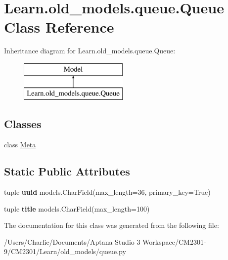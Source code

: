 \hypertarget{class_learn_1_1old__models_1_1queue_1_1_queue}{\section{Learn.\-old\-\_\-models.\-queue.\-Queue Class Reference}
\label{class_learn_1_1old__models_1_1queue_1_1_queue}
}
Inheritance diagram for Learn.\-old\-\_\-models.\-queue.\-Queue\-:\begin{figure}[H]
\begin{center}
\leavevmode
\includegraphics[height=2.000000cm]{class_learn_1_1old__models_1_1queue_1_1_queue}
\end{center}
\end{figure}
\subsection*{Classes}
\begin{DoxyCompactItemize}
\item 
class \hyperlink{class_learn_1_1old__models_1_1queue_1_1_queue_1_1_meta}{Meta}
\end{DoxyCompactItemize}
\subsection*{Static Public Attributes}
\begin{DoxyCompactItemize}
\item 
\hypertarget{class_learn_1_1old__models_1_1queue_1_1_queue_ab4de315be802ee31cd54062e7f73f081}{tuple {\bfseries uuid} models.\-Char\-Field(max\-\_\-length=36, primary\-\_\-key=True)}\label{class_learn_1_1old__models_1_1queue_1_1_queue_ab4de315be802ee31cd54062e7f73f081}

\item 
\hypertarget{class_learn_1_1old__models_1_1queue_1_1_queue_a4b12193e9283873068820743fb1963c5}{tuple {\bfseries title} models.\-Char\-Field(max\-\_\-length=100)}\label{class_learn_1_1old__models_1_1queue_1_1_queue_a4b12193e9283873068820743fb1963c5}

\end{DoxyCompactItemize}


The documentation for this class was generated from the following file\-:\begin{DoxyCompactItemize}
\item 
/\-Users/\-Charlie/\-Documents/\-Aptana Studio 3 Workspace/\-C\-M2301-\/9/\-C\-M2301/\-Learn/old\-\_\-models/queue.\-py\end{DoxyCompactItemize}
